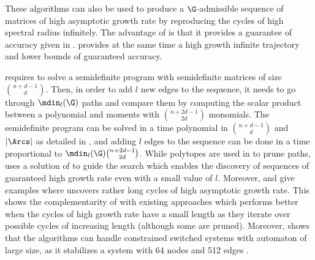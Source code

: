 \documentclass[11pt,twoside,a4paper,openright]{uclouvain-thesis}
\begin{document}
These algorithms can also be used to produce a $\G$-admissible sequence of matrices of high asymptotic growth rate
by reproducing the cycles of high spectral radius infinitely.
The advantage of  is that it provides a guarantee of accuracy given in .
 provides at the same time a high growth infinite trajectory and lower bounds of guaranteed accuracy.

 requires to solve a semidefinite program with semidefinite
matrices of size ${n + d - 1 \choose d}$.
Then, in order to add $l$ new edges to the sequence,
it needs to go through $\mdin_l(\G)$ paths and compare them by computing the scalar product
between a polynomial and moments with ${n + 2d - 1 \choose 2d}$ monomials.
The semidefinite program can be solved in a time polynomial in ${n + d - 1 \choose d}$
and $|\Arcs|$ as detailed in ,
and adding $l$ edges to the sequence can be done in a time proportional to $\mdin_l(\G){n + 2d - 1 \choose 2d}$.
While polytopes are used in \cite{guglielmi2008algorithm, guglielmi2013exact, jungers2014lifted}
to prune paths,  uses a solution of  to guide the search
which enables the discovery of sequences of guaranteed high growth rate even with a small value of $l$.
Moreover,  and  %
give examples where  uncovers rather long cycles of high asymptotic growth rate.
This shows the complementarity of  with existing approaches
which performs better when the cycles of high growth rate have a small length as they
iterate over possible cycles of increasing length (although some are pruned).
Moreover, \cite{gomes2018minimally} shows that the algorithms can handle constrained switched systems with automaton of large size, as it stabilizes a system with 64 nodes and 512 edges \cite[Table I]{gomes2018minimally}.
\end{document}
